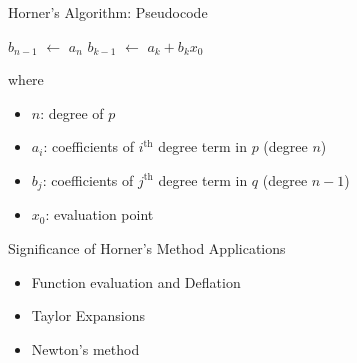 \documentclass[9pt, serif]{beamer}
\newcommand{\bi}{\begin{itemize}}
\newcommand{\ei}{\end{itemize}}
\newcommand*\Let[2]{\State #1 $\gets$ #2}
\begin{document}
\begin{frame}{Horner's Algorithm: Pseudocode}
    \begin{algorithmic}[1]
	 \Let{$b_{n-1}$}{$a_n$}
                \Let{$b_{k-1}$}{$a_k+b_k x_0$}
            \EndFor
            \State \Return{$[b_{-1}, \ldots, b_{n-1}]$}
        \EndFunction
    \end{algorithmic}
    \vspace{5mm}
    where \\
    \bi
	\item[] $n$: degree of $p$
	\item[] $a_i$: coefficients of $i^{\text{th}}$ degree term in $p$ (degree $n$)
	\item[] $b_j$: coefficients of $j^{\text{th}}$ degree term in $q$ (degree $n-1$)
	\item[] $x_0$: evaluation point
    \ei
\end{frame}


\begin{frame}{Significance of Horner's Method}
    Applications
    \pause
    \bi
        \item Function evaluation and Deflation \pause
        \item Taylor Expansions \pause
        \item Newton's method
    \ei
\end{frame}
\end{document}
